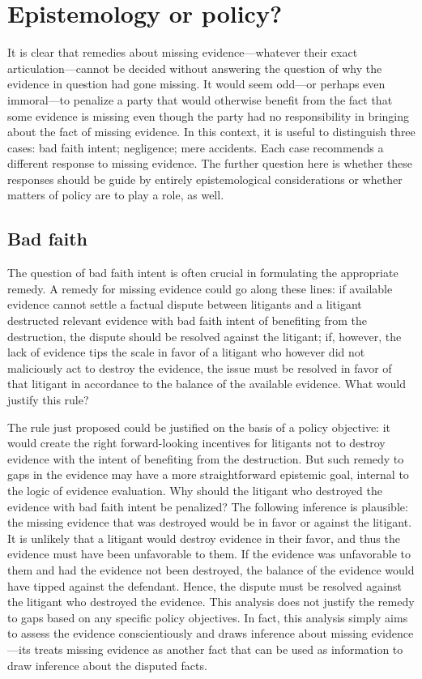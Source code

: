 \documentclass[
  10pt,
  dvipsnames,enabledeprecatedfontcommands]{scrartcl}
\begin{document}
\hypertarget{epistemology-or-policy}{%
\section{Epistemology or policy?}\label{epistemology-or-policy}}

It is clear that remedies about missing evidence---whatever their exact
articulation---cannot be decided without answering the question of why
the evidence in question had gone missing. It would seem odd---or
perhaps even immoral---to penalize a party that would otherwise benefit
from the fact that some evidence is missing even though the party had no
responsibility in bringing about the fact of missing evidence. In this
context, it is useful to distinguish three cases: bad faith intent;
negligence; mere accidents. Each case recommends a different response to
missing evidence. The further question here is whether these responses
should be guide by entirely epistemological considerations or whether
matters of policy are to play a role, as well.

\hypertarget{bad-faith}{%
\subsection{Bad faith}\label{bad-faith}}

The question of bad faith intent is often crucial in formulating the
appropriate remedy. A remedy for missing evidence could go along these
lines: if available evidence cannot settle a factual dispute between
litigants and a litigant destructed relevant evidence with bad faith
intent of benefiting from the destruction, the dispute should be
resolved against the litigant; if, however, the lack of evidence tips
the scale in favor of a litigant who however did not maliciously act to
destroy the evidence, the issue must be resolved in favor of that
litigant in accordance to the balance of the available evidence. What
would justify this rule?

The rule just proposed could be justified on the basis of a policy
objective: it would create the right forward-looking incentives for
litigants not to destroy evidence with the intent of benefiting from the
destruction. But such remedy to gaps in the evidence may have a more
straightforward epistemic goal, internal to the logic of evidence
evaluation. Why should the litigant who destroyed the evidence with bad
faith intent be penalized? The following inference is plausible: the
missing evidence that was destroyed would be in favor or against the
litigant. It is unlikely that a litigant would destroy evidence in their
favor, and thus the evidence must have been unfavorable to them. If the
evidence was unfavorable to them and had the evidence not been
destroyed, the balance of the evidence would have tipped against the
defendant. Hence, the dispute must be resolved against the litigant who
destroyed the evidence. This analysis does not justify the remedy to
gaps based on any specific policy objectives. In fact, this analysis
simply aims to assess the evidence conscientiously and draws inference
about missing evidence---its treats missing evidence as another fact
that can be used as information to draw inference about the disputed
facts.
\end{document}
